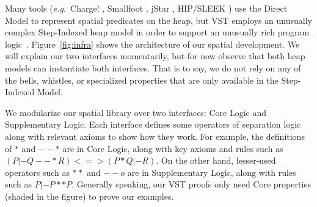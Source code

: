 \documentclass[acmsmall,screen]{acmart}
\newcommand\hide[1]{}
\begin{document}
Many tools (\emph{e.g.}\ Charge! \citep{bengtson:charge},
Smallfoot \citep{berdine:smallfoot}, jStar \citep{distefanop08},
HIP/SLEEK \citep{chin:hipsleek}) use the Direct Model to represent
spatial predicates on the heap, but VST employs an unusually complex
Step-Indexed heap model in order to support an unusually rich program
logic~\cite{appel:programlogics}.  Figure~\ref{fig:infra} shows the
architecture of our spatial development.  We will explain our two
interfaces momentarily, but for now observe that both heap models can
instantiate both interfaces. That is to say, we do not rely on any of the
bells, whistles, or specialized properties that are only available 
in the Step-Indexed Model.

We modularize our spatial library over 
two interfaces: Core Logic and Supplementary Logic.
Each interface defines some operators of separation logic 
along with relevant axioms to show how they work.  
For example, the definitions of $*$ and
$--*$ are in Core Logic, along with key axioms and rules such as
$(P |- Q --* R) <=> (P * Q |- R)$.  
On the other hand, lesser-used operators such as 
$**$ and $--o$ are in Supplementary Logic,
along with rules such as $P |- P ** P$. 
Generally speaking, our VST proofs only need Core properties 
(shaded in the figure) to prove our examples.

\hide{Starting from the bottom, notice that there are two underlying heap models,
VST's Step-Indexed model and the much simpler Direct Model.

To isolate our development from these unnecessary complications,
{\color{magenta}and to ensure that HIP/SLEEK can reuse our spatial
reasoning, we use two interfaces: Core Logic and Supplementary
Logic.  Both models can instantiate both interfaces, but generally
speaking our VST proofs only need the Core properties to prove
our examples, whereas HIP/SLEEK uses both Core and Supplemental.}
Each interface defines some operators of separation logic and
provides some axioms about how they work.  For example, $*$ and
$--*$ are in Core Logic, along with the axiom
$(P |- Q --* R) <=> (P * Q |- R)$.  On the other hand,
the $**$ and $--o$ operators are in Supplementary Logic,
along with rules like $P |- P ** P$.} 
\end{document}
